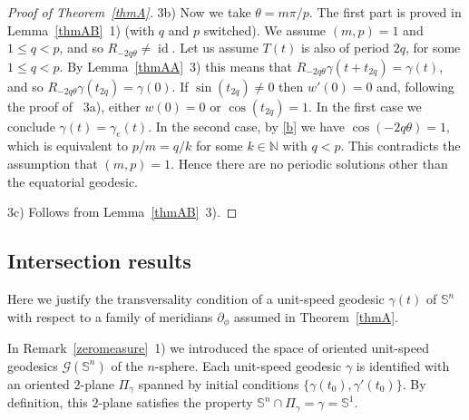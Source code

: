\documentclass[11pt,a4paper,times]{amsart}
\theoremstyle{plain}
\theoremstyle{definition}
\numberwithin{equation}{section}
\DeclareMathOperator\id{id}
\newcommand{\N}{\mathbb{N}}
\newcommand{\Se}{\mathbb{S}}
\begin{document}
\begin{proof}[Proof of Theorem~\ref{thmA}]
3b) Now we take $\theta=m\pi/p$. The first part is proved in Lemma~\ref{thmAB}~{\rm 1)} (with $q$ and $p$ switched).
We assume $(m,p)=1$ and $1\leq q<p$, and so $R_{-2q\theta}\neq \id$.
Let us assume $T(t)$ is also of period $2q$, for some $1\leq q<p$.
By Lemma~\ref{thmAA}{\rm~3)} this means that $R_{-2q\theta}\gamma(t+t_{2q})=\gamma(t)$, and so $R_{-2q\theta}\gamma(t_{2q})=\gamma(0)$.
If $\sin(t_{2q})\neq 0$ then $w'(0)=0$ and, following the proof of {\rm~3a)}, either $w(0)=0$ or $\cos(t_{2q})=1$.
In the first case we conclude $\gamma(t)=\gamma_e(t)$.
In the second case, by \eqref{b} we have $\cos(-2q\theta)=1$, which is equivalent to $p/m=q/k$ for some $k\in \N$ with $q<p$.
This contradicts the assumption that $(m,p)=1$.
Hence there are no periodic solutions other than the equatorial geodesic.
\smallskip

3c) Follows from Lemma~\ref{thmAB}{\rm~3)}.
\end{proof}

\subsection{Intersection results}\label{intersection}
Here we justify the transversality condition of a unit-speed geodesic $\gamma(t)$ of $\Se^n$ with respect to a family of meridians $\partial_{\phi}$ assumed in Theorem~\ref{thmA}.

In Remark~\ref{zeromeasure}~{\rm 1)} we introduced the space of oriented unit-speed geodesics $\mathcal{G}(\Se^n)$ of the $n$-sphere.
Each unit-speed geodesic $\gamma$ is identified with an oriented $2$-plane $\Pi_{\gamma}$ spanned by initial conditions $\{\gamma(t_0), \gamma'(t_0)\}$.
By definition, this $2$-plane satisfies the property $\Se^n\cap \Pi_{\gamma}=\gamma =\Se^1$.
\end{document}
